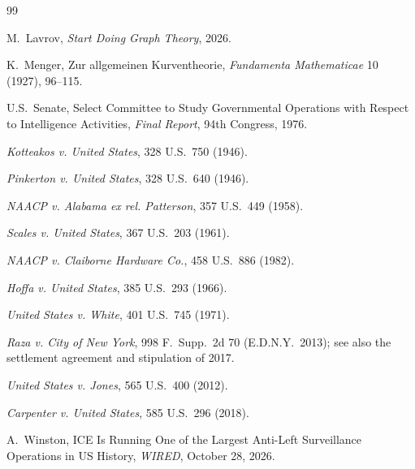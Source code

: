 \documentclass[11pt]{article}
\theoremstyle{definition}
\theoremstyle{remark}
\begin{document}
\begin{thebibliography}{99}

 M.\ Lavrov, \emph{Start Doing Graph Theory}, 2026.

 K.\ Menger, Zur allgemeinen Kurventheorie, \emph{Fundamenta Mathematicae} 10 (1927), 96--115.

 U.S.\ Senate, Select Committee to Study Governmental Operations with Respect to Intelligence Activities, \emph{Final Report}, 94th Congress, 1976.

 \emph{Kotteakos v. United States}, 328 U.S.\ 750 (1946).

 \emph{Pinkerton v. United States}, 328 U.S.\ 640 (1946).

 \emph{NAACP v. Alabama ex rel. Patterson}, 357 U.S.\ 449 (1958).

 \emph{Scales v. United States}, 367 U.S.\ 203 (1961).

 \emph{NAACP v. Claiborne Hardware Co.}, 458 U.S.\ 886 (1982).

 \emph{Hoffa v. United States}, 385 U.S.\ 293 (1966).

 \emph{United States v. White}, 401 U.S.\ 745 (1971).

 \emph{Raza v. City of New York}, 998 F.\ Supp.\ 2d 70 (E.D.N.Y.\ 2013); see also the settlement agreement and stipulation of 2017.

 \emph{United States v. Jones}, 565 U.S.\ 400 (2012).

 \emph{Carpenter v. United States}, 585 U.S.\ 296 (2018).

 A.\ Winston, ICE Is Running One of the Largest Anti-Left Surveillance Operations in US History, \emph{WIRED}, October 28, 2026.

\end{thebibliography}
\end{document}
